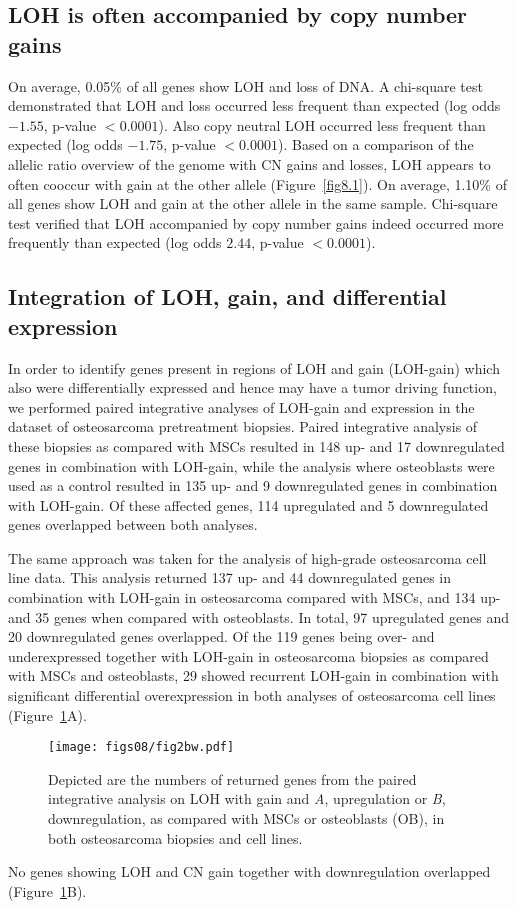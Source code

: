 \subsection{LOH is often accompanied by copy number gains }
On average, 0.05\% of all genes show LOH and loss of DNA. A chi-square test demonstrated that LOH and loss occurred less frequent than expected (log odds $-1.55$, p-value $<0.0001$). Also copy neutral LOH occurred less frequent than expected (log odds $-1.75$, p-value $<0.0001$). Based on a comparison of the allelic ratio overview of the genome with CN gains and losses, LOH appears to often cooccur with gain at the other allele (Figure~\ref{fig8.1}). On average, 1.10\% of all genes show LOH and gain at the other allele in the same sample. Chi-square test verified that LOH accompanied by copy number gains indeed occurred more frequently than expected (log odds $2.44$, p-value $<0.0001$).

\subsection{Integration of LOH, gain, and differential expression}
In order to identify genes present in regions of LOH and gain (LOH-gain) which also were differentially expressed and hence may have a tumor driving function, we performed paired integrative analyses of LOH-gain and expression in the dataset of osteosarcoma pretreatment biopsies. Paired integrative analysis of these biopsies as compared with MSCs resulted in 148 up- and 17 downregulated genes in combination with LOH-gain, while the analysis where osteoblasts were used as a control resulted in 135 up- and 9 downregulated genes in combination with LOH-gain. Of these affected genes, 114 upregulated and 5 downregulated genes overlapped between both analyses. 

The same approach was taken for the analysis of high\hyp{}grade osteosarcoma cell line data. This analysis returned 137 up- and 44 downregulated genes in combination with LOH-gain in osteosarcoma compared with MSCs, and 134 up- and 35 genes when compared with osteoblasts. In total, 97 upregulated genes and 20 downregulated genes overlapped. Of the 119 genes being over- and underexpressed together with LOH-gain in osteosarcoma biopsies as compared with MSCs and osteoblasts, 29 showed recurrent LOH-gain in combination with significant differential overexpression in both analyses of osteosarcoma cell lines (Figure~\ref{fig8.2}A).
%
\begin{figure}[htbp]
  \centering
    \texttt{[image: figs08/fig2bw.pdf]}		%
    \hfill
     \caption{Depicted are the numbers of returned genes from the paired integrative analysis on LOH with gain and {\it A}, upregulation or {\it B}, downregulation, as compared with MSCs or osteoblasts (OB), in both osteosarcoma biopsies and cell lines.}
     \label{fig8.2}
\end{figure}
%
No genes showing LOH and CN gain together with downregulation overlapped (Figure~\ref{fig8.2}B).

